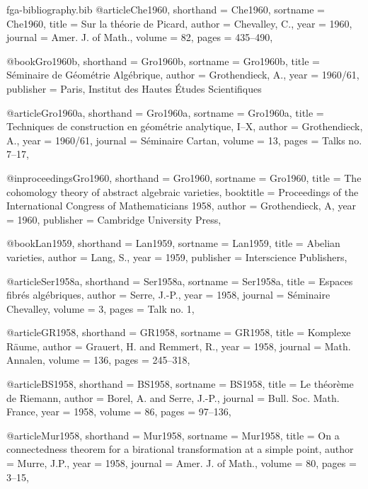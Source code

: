 \begin{filecontents*}{fga-bibliography.bib}
    @article{Che1960,
  shorthand = {Che1960},
  sortname = {Che1960},
  title = {Sur la th\'{e}orie de Picard},
  author = {Chevalley, C.},
  year = {1960},
  journal = {Amer. J. of Math.},
  volume = {82},
  pages = {435--490},
}

    @book{Gro1960b,
  shorthand = {Gro1960b},
  sortname = {Gro1960b},
  title = {{{S\'{e}minaire de G\'{e}om\'{e}trie Alg\'{e}brique}}},
  author = {Grothendieck, A.},
  year = {1960/61},
  publisher = {{Paris, Institut des Hautes \'{E}tudes Scientifiques}}
}

    @article{Gro1960a,
  shorthand = {Gro1960a},
  sortname = {Gro1960a},
  title = {Techniques de construction en g\'{e}om\'{e}trie analytique, {{I}}--{{X}}},
  author = {Grothendieck, A.},
  year = {1960/61},
  journal = {S\'{e}minaire Cartan},
  volume = {13},
  pages = {Talks no. 7--17},
}

    @inproceedings{Gro1960,
  shorthand = {Gro1960},
  sortname = {Gro1960},
  title = {The cohomology theory of abstract algebraic varieties},
  booktitle = {Proceedings of the {{International Congress}} of {{Mathematicians}} 1958},
  author = {Grothendieck, A},
  year = {1960},
  publisher = {{Cambridge University Press}},
}

    @book{Lan1959,
  shorthand = {Lan1959},
  sortname = {Lan1959},
  title = {Abelian varieties},
  author = {Lang, S.},
  year = {1959},
  publisher = {Interscience Publishers},
}

    @article{Ser1958a,
  shorthand = {Ser1958a},
  sortname = {Ser1958a},
  title = {Espaces fibr\'{e}s alg\'{e}briques},
  author = {Serre, J.-P.},
  year = {1958},
  journal = {S\'{e}minaire Chevalley},
  volume = {3},
  pages = {Talk no. 1},
}

    @article{GR1958,
  shorthand = {GR1958},
  sortname = {GR1958},
  title = {{{Komplexe R\"{a}ume}}},
  author = {Grauert, H. and Remmert, R.},
  year = {1958},
  journal = {Math. Annalen},
  volume = {136},
  pages = {245--318},
}

    @article{BS1958,
  shorthand = {BS1958},
  sortname = {BS1958},
  title = {Le th\'{e}or\`{e}me de {{Riemann}}},
  author = {Borel, A. and Serre, J.-P.},
  journal = {Bull. Soc. Math. France},
  year = {1958},
  volume = {86},
  pages = {97--136},
}

    @article{Mur1958,
  shorthand = {Mur1958},
  sortname = {Mur1958},
  title = {On a connectedness theorem for a birational transformation at a simple point},
  author = {Murre, J.P.},
  year = {1958},
  journal = {Amer. J. of Math.},
  volume = {80},
  pages = {3--15},
}


\end{filecontents*}
